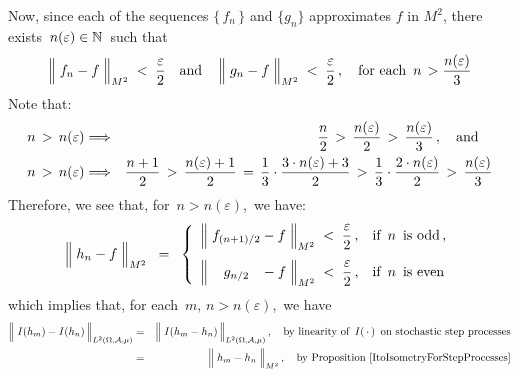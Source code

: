 \begin{enumerate}
	Now, since each of the sequences $\{\,f_{n}\,\}$ and $\{g_{n}\}$ approximates $f$ in $M^{2}$,
	there exists \,$n(\varepsilon) \in \mathbb{N}$\, such that
	\begin{equation*}
	\left\Vert\; f_{n} \overset{{\color{white}.}}{-} f \;\right\Vert_{M^{2}} \; < \; \dfrac{\varepsilon}{2}
	\quad\textnormal{and}\quad
	\left\Vert\; g_{n} \overset{{\color{white}.}}{-} f \;\right\Vert_{M^{2}} \; < \; \dfrac{\varepsilon}{2}\,,
	\quad\textnormal{for each \,$n \,> \dfrac{n(\varepsilon)}{3}$}
	\end{equation*}
	Note that:
	\begin{eqnarray*}
	n \,>\, n(\varepsilon)
	& \Longrightarrow &
		\dfrac{n}{2} \,>\, \dfrac{n(\varepsilon)}{2} \,>\, \dfrac{n(\varepsilon)}{3}\,,
		\quad\textnormal{and}\quad
	\\
	n \,>\, n(\varepsilon)
	& \Longrightarrow &
		\dfrac{n+1}{2}
		\,>\, \dfrac{n(\varepsilon)+1}{2}
		\,=\, \dfrac{1}{3}\cdot\dfrac{3 \cdot n(\varepsilon)+3}{2}
		\,>\, \dfrac{1}{3}\cdot\dfrac{2 \cdot n(\varepsilon)}{2} 
		\,>\, \dfrac{n(\varepsilon)}{3}
	\end{eqnarray*}
	Therefore, we see that, for \,$n > n(\varepsilon)$,\, we have:
	\begin{equation}\label{hMinusFLessThanEpsilon}
	\left\Vert\; h_{n} \overset{{\color{white}.}}{-} f \;\right\Vert_{M^{2}}
	\;\; = \;\;
		\left\{\begin{array}{ll}
		\left\Vert\;
			f_{(n+1)/2} \overset{{\color{white}.}}{-} f
			\;\right\Vert_{M^{2}}
		\;<\; \dfrac{\varepsilon}{2}\,, & \textnormal{if \,$n$\, is odd}\,,
		\\
		\overset{{\color{white}1}}{\left\Vert\;
			{\color{white}...}g_{n/2}{\color{white}...} \overset{{\color{white}.}}{-} f
			\;\right\Vert_{M^{2}}}
		\;<\; \dfrac{\varepsilon}{2}\,, & \textnormal{if \,$n$\, is even}
		\end{array}\right.
	\end{equation}
	which implies that, for each \,$m,\, n > n(\varepsilon)$,\, we have
	\begin{eqnarray*}
	\left\Vert\; I(h_{m}) \overset{{\color{white}.}}{-} I(h_{n}) \,\right\Vert_{L^{2}(\Omega,\mathcal{A},\mu)}
	& = &
		\left\Vert\; I(h_{m} \overset{{\color{white}.}}{-} h_{n}) \,\right\Vert_{L^{2}(\Omega,\mathcal{A},\mu)},
		\quad
		\textnormal{by linearity of \,$I(\,\cdot\,)$\, on stochastic step processes}
	\\
	& = &
		\left\Vert\; h_{m} \overset{{\color{white}.}}{-} h_{n} \;\right\Vert_{M^{2}},
		\quad
		\textnormal{by Proposition \ref{ItoIsometryForStepProcesses}}

\end{eqnarray*}
\end{enumerate}
